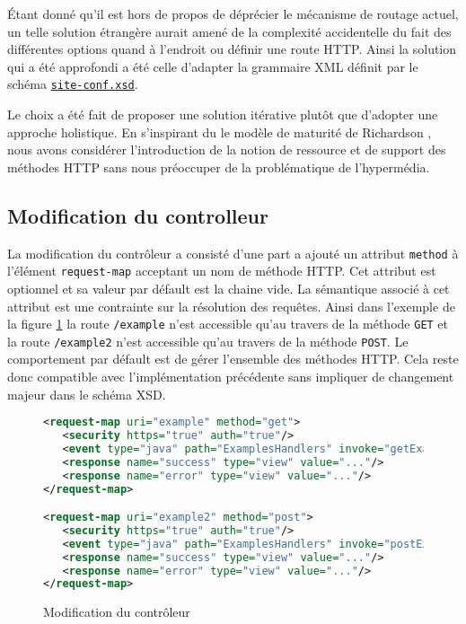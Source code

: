 \documentclass[a4paper, 11pt]{report}
\begin{document}
Étant donné qu'il est hors de propos de déprécier le mécanisme de
routage actuel, un telle solution étrangère aurait amené de la
complexité accidentelle du fait des différentes options quand à
l'endroit ou définir une route HTTP.  Ainsi la solution qui a été
approfondi a été celle d'adapter la grammaire XML définit par le
schéma
\href{http://ofbiz.apache.org/dtds/site-conf.xsd}{\nolinkurl{site-conf.xsd}}.

Le choix a été fait de proposer une solution itérative plutôt que
d'adopter une approche holistique.  En s'inspirant du le modèle de
maturité de Richardson \cite{fowler2010richardson}, nous avons
considérer l'introduction de la notion de ressource et de support des
méthodes HTTP sans nous préoccuper de la problématique de
l'hypermédia.

\subsection{Modification du controlleur}

La modification du contrôleur a consisté d'une part a ajouté un
attribut \verb=method= à l'élément \verb=request-map= acceptant un nom
de méthode HTTP. Cet attribut est optionnel et sa valeur par défault
est la chaine vide. La sémantique associé à cet attribut est une
contrainte sur la résolution des requêtes.  Ainsi dans l'exemple de la
figure \ref{fig:controlmodif} la route \verb=/example= n'est
accessible qu'au travers de la méthode \verb=GET= et la route
\verb=/example2= n'est accessible qu'au travers de la méthode
\verb=POST=.  Le comportement par défault est de gérer l'ensemble des
méthodes HTTP.  Cela reste donc compatible avec l'implémentation
précédente sans impliquer de changement majeur dans le schéma XSD.

\begin{figure}
  \begin{lstlisting}[language=xml]
<request-map uri="example" method="get">
   <security https="true" auth="true"/>
   <event type="java" path="ExamplesHandlers" invoke="getExamples"/>
   <response name="success" type="view" value="..."/>
   <response name="error" type="view" value="..."/>
</request-map>

<request-map uri="example2" method="post">
   <security https="true" auth="true"/>
   <event type="java" path="ExamplesHandlers" invoke="postExamples"/>
   <response name="success" type="view" value="..."/>
   <response name="error" type="view" value="..."/>
</request-map>
  \end{lstlisting}
  \caption{Modification du contrôleur}
  \label{fig:controlmodif}
\end{figure}
\end{document}
